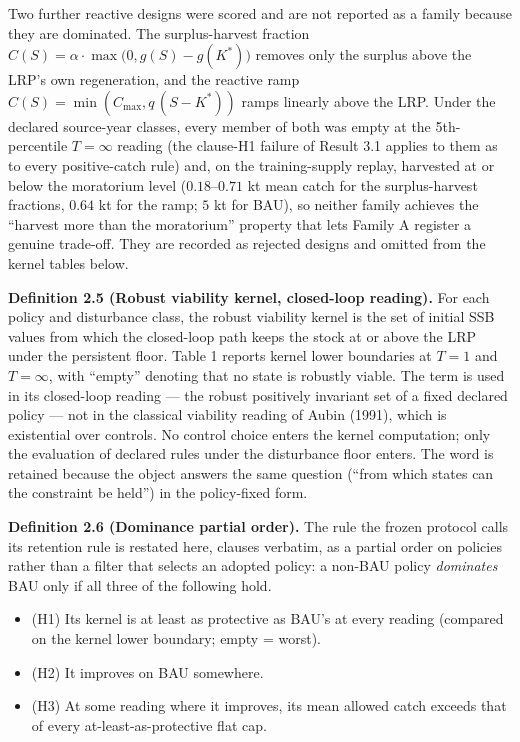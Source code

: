 Two further reactive designs were scored and are not reported as a
family because they are dominated. The surplus-harvest fraction
\(C(S) = \alpha\cdot\max\bigl(0, g(S) - g(K^*)\bigr)\) removes only the
surplus above the LRP's own regeneration, and the reactive ramp
\(C(S) = \min(C_{\max}, q\,(S - K^*))\) ramps linearly above the LRP.
Under the declared source-year classes, every member of both was empty
at the 5th-percentile \(T=\infty\) reading (the clause-H1 failure of
Result 3.1 applies to them as to every positive-catch rule) and, on the
training-supply replay, harvested at or below the moratorium level
(\(0.18\)--\(0.71\) kt mean catch for the surplus-harvest fractions,
\(0.64\) kt for the ramp; \(5\) kt for BAU), so neither family achieves
the ``harvest more than the moratorium'' property that lets Family A
register a genuine trade-off. They are recorded as rejected designs and
omitted from the kernel tables below.

\textbf{Definition 2.5 (Robust viability kernel, closed-loop reading).}
For each policy and disturbance class, the robust viability kernel is
the set of initial SSB values from which the closed-loop path keeps the
stock at or above the LRP under the persistent floor. Table 1 reports
kernel lower boundaries at \(T=1\) and \(T=\infty\), with ``empty''
denoting that no state is robustly viable. The term is used in its
closed-loop reading --- the robust positively invariant set of a fixed
declared policy --- not in the classical viability reading of Aubin
(1991), which is existential over controls. No control choice enters the
kernel computation; only the evaluation of declared rules under the
disturbance floor enters. The word is retained because the object
answers the same question (``from which states can the constraint be
held'') in the policy-fixed form.

\textbf{Definition 2.6 (Dominance partial order).} The rule the frozen
protocol calls its retention rule is restated here, clauses verbatim, as
a partial order on policies rather than a filter that selects an adopted
policy: a non-BAU policy \emph{dominates} BAU only if all three of the
following hold.

\begin{itemize}
\tightlist
\item
  (H1) Its kernel is at least as protective as BAU's at every reading
  (compared on the kernel lower boundary; empty = worst).
\item
  (H2) It improves on BAU somewhere.
\item
  (H3) At some reading where it improves, its mean allowed catch exceeds
  that of every at-least-as-protective flat cap.
\end{itemize}

